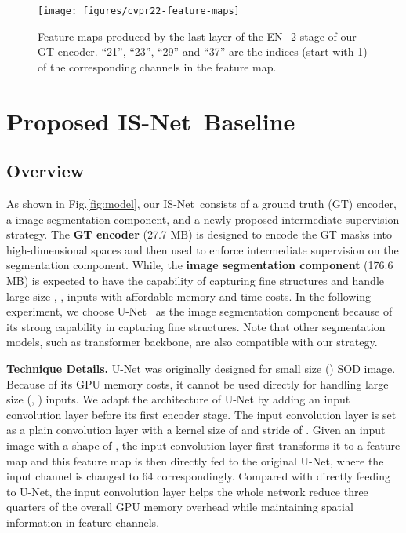 \documentclass[10pt,twocolumn,letterpaper]{article}
\newcommand{\figref}[1]{Fig.\ref{#1}}
\def\ourmodel{IS-Net}
\begin{document}
\begin{figure*}[t!]
    \centering
    \texttt{[image: figures/cvpr22-feature-maps]}
    \vspace{-10pt}
    \caption{\small 
    Feature maps produced by the last layer of the EN\_2 stage of our GT encoder. ``21'', ``23'', ``29'' and ``37'' are the indices (start with 1) of the corresponding channels in the feature map.}
    \label{fig:FS-features}
    \vspace{-10pt}
\end{figure*}

\section{Proposed \ourmodel~Baseline}
\subsection{Overview}
As shown in \figref{fig:model}, our \ourmodel~consists of a ground truth (GT) encoder, a image segmentation component, and a newly proposed intermediate supervision strategy.
The \textbf{GT encoder} (27.7 MB) is designed to encode the GT masks into high-dimensional spaces and then used to enforce intermediate supervision on the segmentation component. While, 
the \textbf{image segmentation component} (176.6 MB) is expected to have the capability of capturing fine structures and handle large size \eg, , inputs with affordable memory and time costs. In the following experiment, we choose U-Net~\cite{qin2020u2} as the image segmentation component because of its strong capability in capturing fine structures. Note that other segmentation models, such as transformer backbone, are also compatible with our strategy. 


\noindent\textbf{Technique Details.}
U-Net was originally designed for small size () SOD image. Because of its GPU memory costs, it cannot be used directly for handling large size (\eg, ) inputs. We adapt the architecture of U-Net by adding an 
input convolution layer before its first encoder stage. 
The input convolution layer is set as a plain convolution layer with a kernel size of  and stride of . Given an input image with a shape of , the input convolution layer first transforms it to a feature map  and this feature map is then directly
fed to the original U-Net, where the input channel is changed to 64 correspondingly. Compared with directly feeding  to U-Net, the input convolution layer helps the whole network reduce three quarters of the overall GPU memory overhead while maintaining spatial information in feature channels. 
\end{document}

